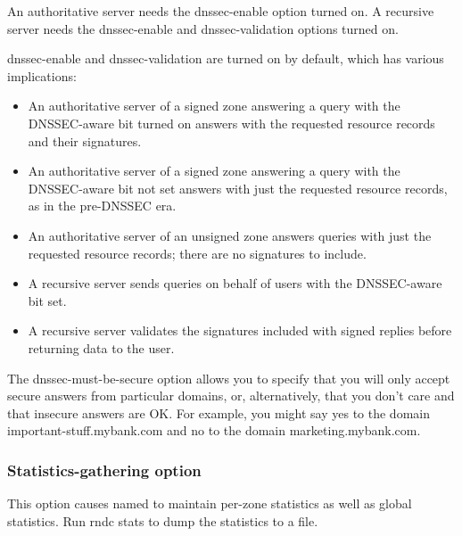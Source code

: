 An authoritative server needs the {dnssec-enable} option turned on. A
recursive server needs the {dnssec-enable} and
\protect\hypertarget{part0024_split_037.htmlux5cux23_idIndexMarker2161}{}{}{dnssec-validation}
options turned on.

{dnssec-enable} and {dnssec-validation} are turned on by default, which
has various implications:

\begin{itemize}
\tightlist
\item
  An authoritative server of a signed zone answering a query with the
  {DNSSEC}-aware bit turned on answers with the requested resource
  records and their signatures.
\item
  An authoritative server of a signed zone answering a query with the
  {DNSSEC}-aware bit {not} set answers with just the requested resource
  records, as in the pre-DNSSEC era.
\item
  An authoritative server of an unsigned zone answers queries with just
  the requested resource records; there are no signatures to include.
\item
  A recursive server sends queries on behalf of users with the
  DNSSEC-aware bit set.
\item
  A recursive server validates the signatures included with signed
  replies before returning data to the user.
\end{itemize}

The {dnssec-must-be-secure} option allows you to specify that you will
only accept secure answers from particular domains, or, alternatively,
that you don't care and that insecure answers are OK. For example, you
might say yes to the domain {important-stuff.mybank.com} and no to the
domain {marketing.mybank.com}.

\subsubsection[Statistics-gathering
option]{\texorpdfstring{Statistics-gathering
option\protect\hypertarget{part0024_split_037.htmlux5cux23_idIndexMarker2162}{}{}}{Statistics-gathering option}}


\protect\hypertarget{part0024_split_037.htmlux5cux23_idIndexMarker2163}{}{}This
option causes {named} to maintain per-zone statistics as well as global
statistics.
\protect\hypertarget{part0024_split_037.htmlux5cux23_idIndexMarker2164}{}{}Run
\protect\hypertarget{part0024_split_037.htmlux5cux23_idIndexMarker2165}{}{}{rndc
stats} to dump the statistics to a file.

